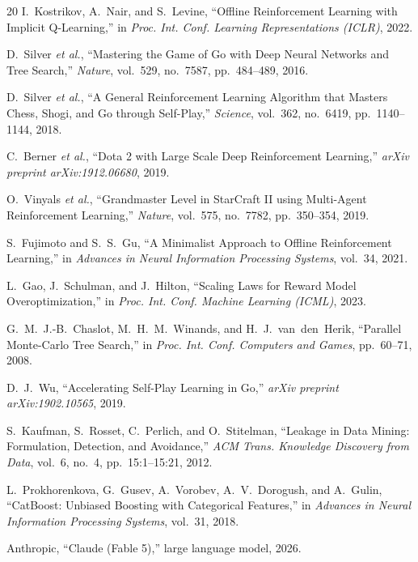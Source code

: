 \documentclass[journal]{IEEEtran}
\providecommand{\DIFaddtex}[1]{{\protect\color{blue} \sf #1}} %
\providecommand{\DIFaddbegin}{} %
\providecommand{\DIFaddend}{} %
\providecommand{\DIFadd}[1]{\texorpdfstring{\DIFaddtex{#1}}{#1}} %
\begin{document}
\begin{thebibliography}{20}
I.~Kostrikov, A.~Nair, and S.~Levine, ``Offline Reinforcement Learning with Implicit Q-Learning,'' in \textit{Proc. Int. Conf. Learning Representations (ICLR)}, 2022.

D.~Silver \textit{et al.}, ``Mastering the Game of Go with Deep Neural Networks and Tree Search,'' \textit{Nature}, vol.~529, no.~7587, pp.~484--489, 2016.

D.~Silver \textit{et al.}, ``A General Reinforcement Learning Algorithm that Masters Chess, Shogi, and Go through Self-Play,'' \textit{Science}, vol.~362, no.~6419, pp.~1140--1144, 2018.

C.~Berner \textit{et al.}, ``Dota 2 with Large Scale Deep Reinforcement Learning,'' \textit{arXiv preprint arXiv:1912.06680}, 2019.

O.~Vinyals \textit{et al.}, ``Grandmaster Level in StarCraft II using Multi-Agent Reinforcement Learning,'' \textit{Nature}, vol.~575, no.~7782, pp.~350--354, 2019.

S.~Fujimoto and S.~S.~Gu, ``A Minimalist Approach to Offline Reinforcement Learning,'' in \textit{Advances in Neural Information Processing Systems}, vol.~34, 2021.

L.~Gao, J.~Schulman, and J.~Hilton, ``Scaling Laws for Reward Model Overoptimization,'' in \textit{Proc. Int. Conf. Machine Learning (ICML)}, 2023.

G.~M.~J.-B.~Chaslot, M.~H.~M.~Winands, and H.~J.~van~den~Herik, ``Parallel Monte-Carlo Tree Search,'' in \textit{Proc. Int. Conf. Computers and Games}, pp.~60--71, 2008.

D.~J.~Wu, ``Accelerating Self-Play Learning in Go,'' \textit{arXiv preprint arXiv:1902.10565}, 2019.
\DIFaddbegin 

\DIFadd{S.~Kaufman, S.~Rosset, C.~Perlich, and O.~Stitelman, ``Leakage in Data Mining: Formulation, Detection, and Avoidance,'' \textit{ACM Trans. Knowledge Discovery from Data}, vol.~6, no.~4, pp.~15:1--15:21, 2012.
}

\DIFadd{L.~Prokhorenkova, G.~Gusev, A.~Vorobev, A.~V.~Dorogush, and A.~Gulin, ``CatBoost: Unbiased Boosting with Categorical Features,'' in \textit{Advances in Neural Information Processing Systems}, vol.~31, 2018.
}\DIFaddend 

Anthropic, ``Claude (Fable 5),'' large language model, 2026.


\end{thebibliography}
\end{document}
